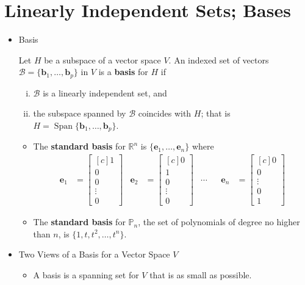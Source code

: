 \documentclass[10pt]{book}
\newenvironment{boxdef}{\begin{mdframed}[backgroundcolor=gray!30,linewidth=0pt,nobreak=true]}{\end{mdframed}}
\newcommand{\R}{\mathbb{R}}
\newcommand{\Poly}{\mathbb{P}}
\newcommand{\B}{\mathscr{B}}
\newcommand{\vect}[1]{\ensuremath{\boldsymbol{\mathbf{#1}}}}
\DeclareMathOperator{\Span}{Span}
\newcommand{\ve}[1]{\vect{e}_{#1}}
\newcommand{\vectset}[3][v]{\{\vect{#1}_{#2},\ldots,\vect{#1}_{#3}\}}
\begin{document}
\section{Linearly Independent Sets; Bases}
\begin{itemize}
	\item Basis
	\begin{boxdef}
		Let $H$ be a subspace of a vector space $V$. An indexed set of vectors $\B=\vectset[b]{1}{p}$ in $V$ is a \textbf{basis} for $H$ if
		\begin{enumerate}[(i)]
			\item $\B$ is a linearly independent set, and
			\item the subspace spanned by $\B$ coincides with $H$; that is $H=\Span\vectset[b]{1}{p}$.
		\end{enumerate}
	\end{boxdef}
		\begin{itemize}
			\item The \textbf{standard basis} for $\R^n$ is $\vectset[e]{1}{n}$ where
			\begin{align*}
			\ve1 &= \begin{bmatrix}[c] 1\\0\\0\\ \vdots \\0\end{bmatrix} &
			\ve2 &= \begin{bmatrix}[c] 0\\1\\0\\ \vdots \\0\end{bmatrix} &
			\cdots &&
			\ve{n} &= \begin{bmatrix}[c] 0\\0\\ \vdots \\0\\1\end{bmatrix}
			\end{align*}
			\item The \textbf{standard basis} for $\Poly_n$, the set of polynomials of degree no higher than $n$, is $\{1,t,t^2,\ldots, t^n\}$.
		\end{itemize}
	\item Two Views of a Basis for a Vector Space $V$
		\begin{itemize}
			\item A basis is a spanning set for $V$ that is as small as possible.

\end{itemize}
\end{itemize}
\end{document}
